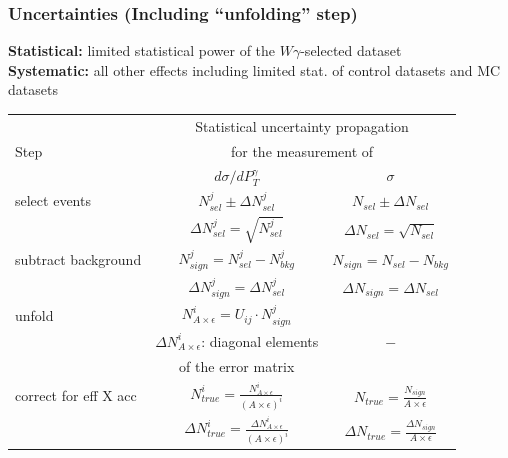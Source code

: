 \begin{frame}\frametitle{Uncertainties (Including ``unfolding'' step)}
\scriptsize{\bfseries{Statistical:}} \tiny{limited statistical power of the $W\gamma$-selected dataset}\\
\scriptsize{\bfseries{Systematic:}} \tiny{all other effects including limited stat. of control datasets and MC datasets}\\

  \begin{table}[h]
  \tiny
  \begin{center}
  \begin{tabular}{|l|c|c|}
    \hline
          & \multicolumn{2}{|c|}{Statistical uncertainty propagation} \\ 
     Step & \multicolumn{2}{|c|}{for the measurement of} \\
          & $d\sigma/dP_{T}^{\gamma}$ & $\sigma$ \\ \hline

    select events & $N_{sel}^j \pm \Delta N_{sel}^j$ &    $N_{sel} \pm \Delta N_{sel}$       \\ 
                  & {\color{blue}$\Delta N_{sel}^j = \sqrt{N_{sel}^j}$} &  {\color{blue}$\Delta N_{sel} = \sqrt{N_{sel}}$}   \\ \hline

    subtract background & $N_{sign}^j = N_{sel}^j - N_{bkg}^j$ &    $N_{sign}=N_{sel}-N_{bkg}$       \\ 
                        & {\color{blue}$\Delta N_{sign}^j = \Delta N_{sel}^j$} &    {\color{blue}$\Delta N_{sign} = \Delta N_{sel}$}   \\ \hline

    unfold   & $N_{A\times\epsilon}^i = U_{ij} \cdot N_{sign}^j$ &           \\ 
             & {\color{blue}$\Delta N_{A\times\epsilon}^i$: diagonal elements} &    $-$       \\ 
             & {\color{blue}of the error matrix} &           \\ \hline

    correct for eff X acc & $N_{true}^i = \frac{N_{A\times\epsilon}^i}{(A \times\epsilon)^i}$ &  $N_{true}=\frac{N_{sign}}{A\times\epsilon}$       \\ 
                          & {\color{blue}$\Delta N_{true}^i = \frac{\Delta N_{A\times\epsilon}^i}{(A \times\epsilon)^i}$} &  {\color{blue}$\Delta N_{true}=\frac{\Delta N_{sign}}{A\times\epsilon}$}       \\ \hline


\end{tabular}
\end{center}
\end{table}
\end{frame}
